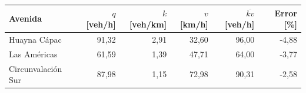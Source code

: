 \begin{tabular}{lrrrrr}
\toprule
Avenida & $q$ [veh/h] & $k$ [veh/km] & $v$ [km/h] & $\overline{kv}$ [veh/h] & Error [\%] \\
\midrule
Huayna Cápac & 91,32 & 2,91 & 32,60 & 96,00 & -4,88 \\
Las Américas & 61,59 & 1,39 & 47,71 & 64,00 & -3,77 \\
Circunvalación Sur & 87,98 & 1,15 & 72,98 & 90,31 & -2,58 \\
\bottomrule
\end{tabular}
